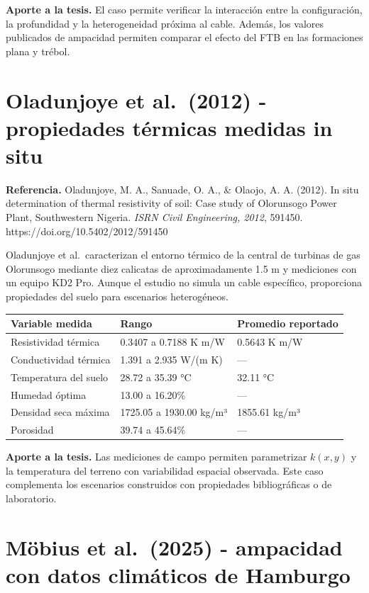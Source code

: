 \documentclass[11pt,a4paper,oneside]{report}
\newcounter{none}
\begin{document}
\textbf{Aporte a la tesis.} El caso permite verificar la interacción
entre la configuración, la profundidad y la heterogeneidad próxima al
cable. Además, los valores publicados de ampacidad permiten comparar el
efecto del FTB en las formaciones plana y trébol.

\section{Oladunjoye et al.~(2012) - propiedades térmicas medidas in
situ}\label{oladunjoye-et-al.-2012---propiedades-tuxe9rmicas-medidas-in-situ}

\textbf{Referencia.} Oladunjoye, M. A., Sanuade, O. A., \& Olaojo, A. A.
(2012). In situ determination of thermal resistivity of soil: Case study
of Olorunsogo Power Plant, Southwestern Nigeria. \emph{ISRN Civil
Engineering, 2012}, 591450. https://doi.org/10.5402/2012/591450

Oladunjoye et al.~caracterizan el entorno térmico de la central de
turbinas de gas Olorunsogo mediante diez calicatas de aproximadamente
1.5 m y mediciones con un equipo KD2 Pro. Aunque el estudio no simula un
cable específico, proporciona propiedades del suelo para escenarios
heterogéneos.

{\def\LTcaptype{none} %
\begin{longtable}[]{@{}lll@{}}
\toprule\noalign{}
Variable medida & Rango & Promedio reportado \\
\midrule\noalign{}
\endhead
\bottomrule\noalign{}
\endlastfoot
Resistividad térmica & 0.3407 a 0.7188 K m/W & 0.5643 K m/W \\
Conductividad térmica & 1.391 a 2.935 W/(m K) & --- \\
Temperatura del suelo & 28.72 a 35.39 °C & 32.11 °C \\
Humedad óptima & 13.00 a 16.20\% & --- \\
Densidad seca máxima & 1725.05 a 1930.00 kg/m³ & 1855.61 kg/m³ \\
Porosidad & 39.74 a 45.64\% & --- \\
\end{longtable}
}

\textbf{Aporte a la tesis.} Las mediciones de campo permiten
parametrizar \(k(x,y)\) y la temperatura del terreno con variabilidad
espacial observada. Este caso complementa los escenarios construidos con
propiedades bibliográficas o de laboratorio.

\section{Möbius et al.~(2025) - ampacidad con datos climáticos de
Hamburgo}\label{muxf6bius-et-al.-2025---ampacidad-con-datos-climuxe1ticos-de-hamburgo}
\end{document}
